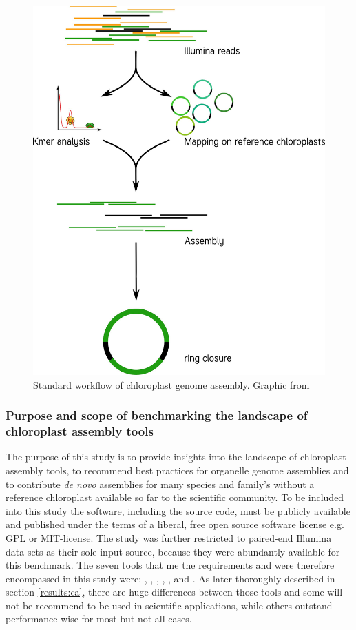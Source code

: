 \begin{figure}[H]
\centering
\includegraphics[height=.65\textheight, width=.95\textwidth]{Figures/CE_workflow}
\decoRule
\caption[Chloroplast genome assembly workflow]{Standard workflow of chloroplast genome assembly. Graphic from \cite{j_ankenbrand_chloroextractor:_2018} }
\label{fig:cpast_workflow}
\end{figure}


\subsubsection{Purpose and scope of benchmarking the landscape of chloroplast assembly tools}

The purpose of this study is to provide insights into the landscape of chloroplast assembly tools, to
recommend best practices for organelle genome assemblies and to contribute \textit{de novo} assemblies for
many species and family's without a reference chloroplast available so far to the scientific
community. \newline To be included into this study the software, including the source code, must be publicly
available and published under the terms of a liberal, free open source software license e.g. GPL or
MIT-license. The study was further restricted to paired-end Illumina data sets as their sole input source, because
they were abundantly available for this benchmark. The seven tools that me the requirements and were therefore
encompassed in this study were: \ce, \oa, \fp, \ioga, \np, \go and \cassp. As later thoroughly described in
section \ref{results:ca}, there are huge differences between those tools and some will not be recommend to be
used in scientific applications, while others outstand performance wise for most but not all cases.


